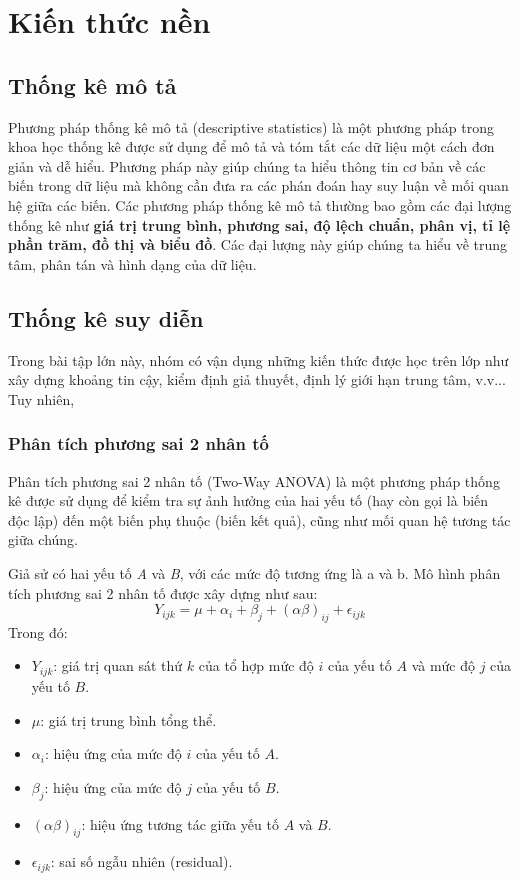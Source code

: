 \section{Kiến thức nền}\label{Kien thuc nen}
\subsection{Thống kê mô tả}
Phương pháp thống kê mô tả (descriptive statistics) là một phương pháp trong khoa học thống kê được sử dụng để mô tả và tóm tắt các dữ liệu một cách đơn giản và dễ hiểu. Phương pháp này giúp chúng ta hiểu thông tin cơ bản về các biến trong dữ liệu mà không cần đưa ra các phán đoán hay suy luận về mối quan hệ giữa các biến. Các phương pháp thống kê mô tả thường bao gồm các đại lượng thống kê như \textbf{giá trị trung bình, phương sai, độ lệch chuẩn, phân vị, tỉ lệ phần trăm, đồ thị và biểu đồ}. Các đại lượng này giúp chúng ta hiểu về trung tâm, phân tán và hình dạng của dữ liệu.
\subsection{Thống kê suy diễn}
Trong bài tập lớn này, nhóm có vận dụng những kiến thức được học trên lớp như xây dựng khoảng tin cậy, kiểm định giả thuyết, định lý giới hạn trung tâm, v.v... Tuy nhiên, 
\subsubsection{Phân tích phương sai 2 nhân tố}
Phân tích phương sai 2 nhân tố (Two-Way ANOVA) là một phương pháp thống kê được sử dụng để kiểm tra sự ảnh hưởng của hai yếu tố (hay còn gọi là biến độc lập) đến một biến phụ thuộc (biến kết quả), cũng như mối quan hệ tương tác giữa chúng.

Giả sử có hai yếu tố \textit{A} và \textit{B}, với các mức độ tương ứng là a và b. Mô hình phân tích phương sai 2 nhân tố được xây dựng như sau:
\[
Y_{ijk} = \mu + \alpha_i + \beta_j + (\alpha \beta)_{ij} + \epsilon_{ijk}
\]
Trong đó:
\begin{itemize}
  \item \( Y_{ijk} \): giá trị quan sát thứ \( k \) của tổ hợp mức độ \( i \) của yếu tố \( A \) và mức độ \( j \) của yếu tố \( B \).
  \item \( \mu \): giá trị trung bình tổng thể.
  \item \( \alpha_i \): hiệu ứng của mức độ \( i \) của yếu tố \( A \).
  \item \( \beta_j \): hiệu ứng của mức độ \( j \) của yếu tố \( B \).
  \item \( (\alpha\beta)_{ij} \): hiệu ứng tương tác giữa yếu tố \( A \) và \( B \).
  \item \( \epsilon_{ijk} \): sai số ngẫu nhiên (residual).
\end{itemize}
